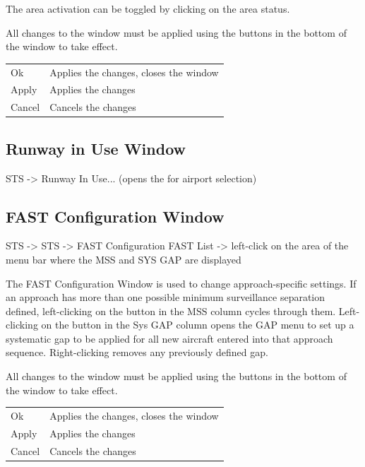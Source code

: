\documentclass[a4paper,oneside,11pt]{memoir}
\begin{document}
The area activation can be toggled by clicking on the area status.

\bigskip

All changes to the window must be applied using the buttons in the bottom of the window to take effect.

\begin{longtable}{p{2.5cm} p{10cm}}
  Ok      & Applies the changes, closes the window\\
  Apply   & Applies the changes\\
  Cancel  & Cancels the changes\\
\end{longtable}

\subsection{Runway in Use Window}\label{win:riuw}

 STS -> Runway In Use... (opens the  for airport selection) 

\subsection{FAST Configuration Window}\label{win:fastcw}

 STS -> STS -> FAST Configuration
FAST List -> left-click on the area of the menu bar where the MSS and SYS GAP are displayed


The FAST Configuration Window is used to change approach-specific settings. If an approach has more than one possible minimum surveillance separation defined, left-clicking on the button in the MSS column cycles through them. Left-clicking on the button in the Sys GAP column opens the GAP menu to set up a systematic gap to be applied for all new aircraft entered into that approach sequence. Right-clicking removes any previously defined gap.

\bigskip

All changes to the window must be applied using the buttons in the bottom of the window to take effect.

\begin{longtable}{p{2.5cm} p{10cm}}
  Ok      & Applies the changes, closes the window\\
  Apply   & Applies the changes\\
  Cancel  & Cancels the changes\\
\end{longtable}
\end{document}
